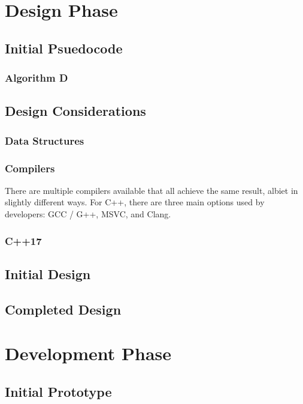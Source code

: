\documentclass{article}
\begin{document}
\newpage
\section{Design Phase}
\subsection{Initial Psuedocode}
\subsubsection{Algorithm D}
\subsection{Design Considerations}
\subsubsection{Data Structures}
\subsubsection{Compilers}
There are multiple compilers available that all achieve the same result, albiet in slightly different ways. For C++, there are three main options used by
developers: GCC / G++, MSVC, and Clang.

\subsubsection{C++17}

\subsection{Initial Design}
\subsection{Completed Design}

\newpage
\section{Development Phase}
\subsection{Initial Prototype}
\end{document}
